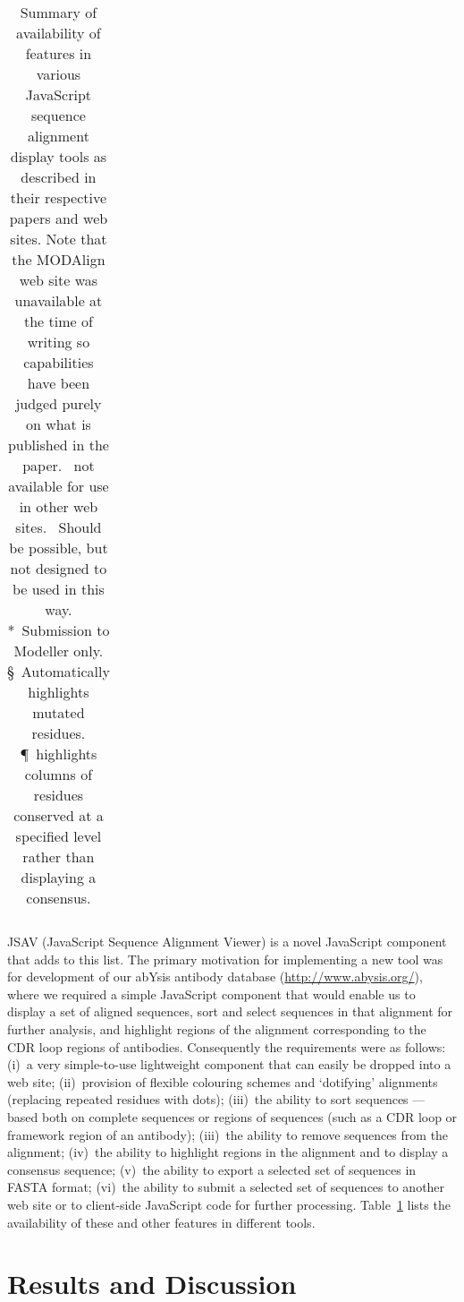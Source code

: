 \documentclass[12pt]{article}
\begin{document}
\begin{table}
\begin{center}
\begin{tabularx}{\linewidth}{Xlllll}
\end{tabularx}
\end{center}
\caption{\label{tab:features}Summary of availability of features in
  various JavaScript sequence alignment display tools as described in
  their respective papers and web sites. Note that the MODAlign web
  site was unavailable at the time of writing so capabilities have
  been judged purely on what is published in the paper. \dag~not
  available for use in other web sites. \ddag~Should be possible,
  but not designed to be used in this way. *~Submission to Modeller
  only. \S~Automatically highlights mutated residues. \P~highlights
  columns of residues conserved at a specified level rather than
  displaying a consensus.} 
\end{table}

JSAV (JavaScript Sequence Alignment Viewer) is a novel JavaScript
component that adds to this list. The primary motivation for
implementing a new tool was for development of our abYsis antibody
database (\url{http://www.abysis.org/}), where we required a simple
JavaScript component that would enable us to display a set of aligned
sequences, sort and select sequences in that alignment for further
analysis, and highlight regions of the alignment corresponding to the
CDR loop regions of antibodies. Consequently the requirements were as
follows: (i)~a very simple-to-use lightweight component that can
easily be dropped into a web site; (ii)~provision of flexible
colouring schemes and `dotifying' alignments (replacing repeated
residues with dots); (iii)~the ability to sort sequences --- based
both on complete sequences or regions of sequences (such as a CDR loop
or framework region of an antibody); (iii)~the ability to remove
sequences from the alignment; (iv)~the ability to highlight regions in
the alignment and to display a consensus sequence; (v)~the ability to
export a selected set of sequences in FASTA format; (vi)~the ability
to submit a selected set of sequences to another web site or to
client-side JavaScript code for further processing.
Table~\ref{tab:features} lists the availability of these and other
features in different tools.

\section{Results and Discussion}
\end{document}
